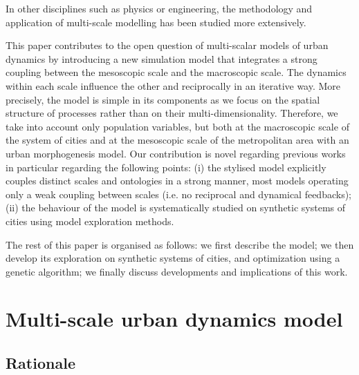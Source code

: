 \documentclass[referee,lineno,pdflatex,sn-apa]{sn-jnl}
\begin{document}
In other disciplines such as physics or engineering, the methodology and application of multi-scale modelling has been studied more extensively. \cite{lockerby2015asynchronous}



This paper contributes to the open question of multi-scalar models of urban dynamics by introducing a new simulation model that integrates a strong coupling between the mesoscopic scale and the macroscopic scale. The dynamics within each scale influence the other and reciprocally in an iterative way. More precisely, the model is simple in its components as we focus on the spatial structure of processes rather than on their multi-dimensionality. Therefore, we take into account only population variables, but both at the macroscopic scale of the system of cities and at the mesoscopic scale of the metropolitan area with an urban morphogenesis model. Our contribution is novel regarding previous works in particular regarding the following points: (i) the stylised model explicitly couples distinct scales and ontologies in a strong manner, most models operating only a weak coupling between scales (i.e. no reciprocal and dynamical feedbacks); (ii) the behaviour of the model is systematically studied on synthetic systems of cities using model exploration methods.
 

 
The rest of this paper is organised as follows: we first describe the model; we then develop its exploration on synthetic systems of cities, and optimization using a genetic algorithm; we finally discuss developments and implications of this work.


\section{Multi-scale urban dynamics model}

\subsection{Rationale}
\end{document}
